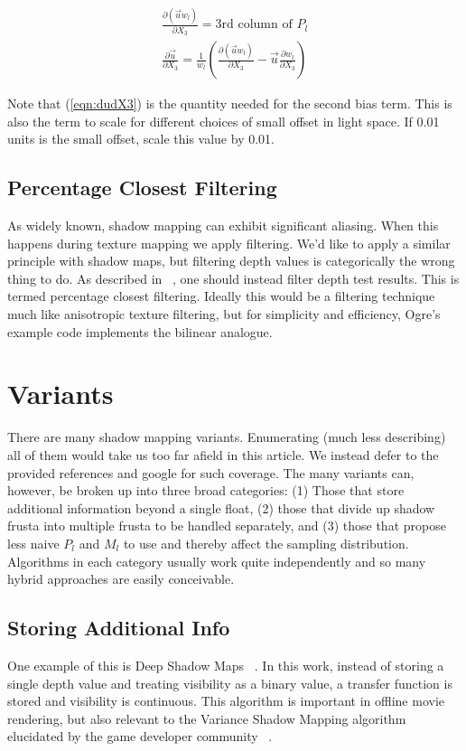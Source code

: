 \documentclass[]{article}  %
\begin{document}
\begin{eqnarray}  
\label{eqn:duwdX3}
  \frac{\partial (\vec{u} w_l)}{\partial X_3} = \mbox{3rd column of } P_l \\
\label{eqn:dudX3}
  \frac{\partial \vec{u}}{\partial X_3} = \frac{1}{w_l} \left( \frac{\partial (\vec{u} w_l)}{\partial X_3} - \vec{u}\frac{\partial w_l}{\partial X_3} \right)
\end{eqnarray}

Note that (\ref{eqn:dudX3}) is the quantity needed for the second bias term.  This is also the term to scale for different choices of small offset in light space.  If 0.01 units is the small offset, scale this value by 0.01.  

\subsection{Percentage Closest Filtering}
As widely known, shadow mapping can exhibit significant aliasing.  When this happens during texture mapping we apply filtering.  We'd like to apply a similar principle with shadow maps, but filtering depth values is categorically the wrong thing to do.  As described in ~\cite{RSC87}, one should instead filter depth test results.  This is termed percentage closest filtering.  Ideally this would be a filtering technique much like anisotropic texture filtering, but for simplicity and efficiency, Ogre's example code implements the bilinear analogue.


\section{Variants}

There are many shadow mapping variants.  Enumerating (much less describing) all of them would take us too far afield in this article.  We instead defer to the provided references and google for such coverage.  The many variants can, however, be broken up into three broad categories: (1) Those that store additional information beyond a single float, (2) those that divide up shadow frusta into multiple frusta to be handled separately, and (3) those that propose less naive $P_l$ and $M_l$ to use and thereby affect the sampling distribution.  Algorithms in each category usually work quite independently and so many hybrid approaches are easily conceivable.  

\subsection{Storing Additional Info}
One example of this is Deep Shadow Maps ~\cite{LV00}.  In this work, instead of storing a single depth value and treating visibility as a binary value, a transfer function is stored and visibility is continuous.  This algorithm is important in offline movie rendering, but also relevant to the Variance Shadow Mapping algorithm elucidated by the game developer community ~\cite{DL06}.  
\end{document}
